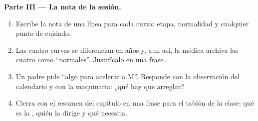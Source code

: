 \begin{problem}
\medskip\noindent\textbf{Parte III --- La nota de la sesión.}
\begin{enumerate}[resume]
  \item Escribe la nota de una línea para cada curva: etapa,
        normalidad y cualquier punto de cuidado.
  \item Las cuatro curvas se diferencian en años y, aun así, la médica
        archiva las cuatro como ``normales''. Justifícalo en una frase.
  \item Un padre pide ``algo para acelerar a M''. Responde con la
        observación del calendario y con la maquinaria: ¿qué hay que
        arreglar?
  \item Cierra con el resumen del capítulo en una frase para el tablón
        de la clase: qué es la , quién la dirige y qué necesita.
\end{enumerate}
\end{problem}
